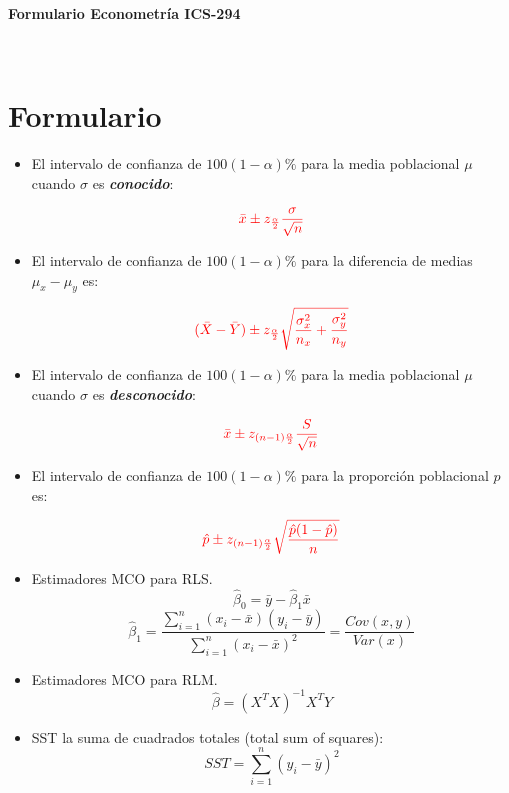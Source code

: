 \documentclass[10pt,a4paper]{article}
\begin{document}
\vspace{5cm}

\begin{center}
\begin{Large}
\textbf{\\Formulario Econometría ICS-294}
\end{Large}\\
\end{center}

    
\section{Formulario}
\begin{itemize}

\item El intervalo de confianza de $100(1-\alpha)\%$ para la media poblacional $\mu$ cuando $\sigma$ es \emph{\textbf{conocido}}:

$$\color{red}{\bar{x} \pm z_{\frac{\alpha}{2}}\frac{\sigma}{\sqrt{n}}}$$

\item El intervalo de confianza de $100(1-\alpha)\%$ para la diferencia de medias
$\mu_x-\mu_y$ es:

$${\color{red}(\bar{X}-\bar{Y}) \pm z_{\frac{\alpha}{2}}\sqrt{\frac{\sigma_x^2}{n_x}+\frac{\sigma_y^2}{n_y}}}$$


\item El intervalo de confianza de $100(1-\alpha)\%$ para la media poblacional $\mu$ cuando $\sigma$ es \emph{\textbf{desconocido}}:

$$\color{red}{\bar{x} \pm z_{(n-1)\frac{\alpha}{2}}\frac{S}{\sqrt{n}}}$$

\item El intervalo de confianza de $100(1-\alpha)\%$ para la proporción poblacional $p$ es:

$$\color{red}{\hat{p} \pm z_{(n-1)\frac{\alpha}{2}}\sqrt{\frac{\hat{p}(1-\hat{p})}{{n}}}}$$


\item  Estimadores MCO para RLS.
{\color{red}
$$\hat{\beta}_0 = \bar{y} - \hat{\beta}_1 \bar{x} $$
$$\hat{\beta}_1 = \frac{\sum_{i=1}^{n}(x_i - \bar{x})(y_i-\bar{y})}{\sum_{i=1}^{n}(x_i - \bar{x})^2}=\frac{Cov(x,y)}{Var(x)}$$}


\item  Estimadores MCO para RLM.
{\color{red}
$${\hat{\beta}} = (X^TX)^{-1} X^TY $$}

    
\item SST la suma de cuadrados totales (total sum of squares):
	{\color{red}	\[ SST = \sum_{i=1}^{n} (y_i - \bar{y})^2 \]}
		

\end{itemize}
\end{document}
